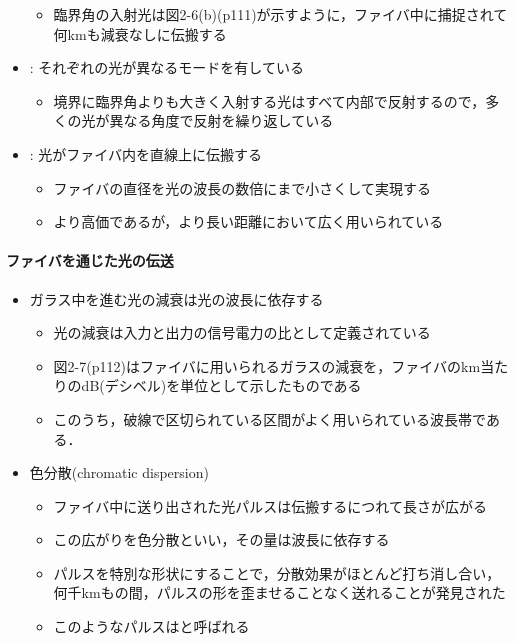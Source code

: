 \documentclass[a4paper]{ltjsarticle}
\begin{document}
\begin{itemize}
\begin{itemize}
					\item 臨界角の入射光は図2-6(b)(p111)が示すように，ファイバ中に捕捉されて何kmも減衰なしに伝搬する
				\end{itemize}
				\item {} : それぞれの光が異なるモードを有している
				\begin{itemize}
					\item 境界に臨界角よりも大きく入射する光はすべて内部で反射するので，多くの光が異なる角度で反射を繰り返している
				\end{itemize}
				\item {} : 光がファイバ内を直線上に伝搬する
				\begin{itemize}
					\item ファイバの直径を光の波長の数倍にまで小さくして実現する
					\item より高価であるが，より長い距離において広く用いられている
				\end{itemize}
			\end{itemize}
			\paragraph{ファイバを通じた光の伝送}
				\begin{itemize}
					\item ガラス中を進む光の減衰は光の波長に依存する
					\begin{itemize}
						\item 光の減衰は入力と出力の信号電力の比として定義されている
						\item 図2-7(p112)はファイバに用いられるガラスの減衰を，ファイバの\si{km}当たりの\si{dB}(デシベル)を単位として示したものである
						\item このうち，破線で区切られている区間がよく用いられている波長帯である．
					\end{itemize}
					\item 色分散(chromatic dispersion)
					\begin{itemize}
						\item ファイバ中に送り出された光パルスは伝搬するにつれて長さが広がる
						\item この広がりを色分散といい，その量は波長に依存する
						\item パルスを特別な形状にすることで，分散効果がほとんど打ち消し合い，何千kmもの間，パルスの形を歪ませることなく送れることが発見された
						\item このようなパルスはと呼ばれる
					\end{itemize}
				\end{itemize}
\end{document}
